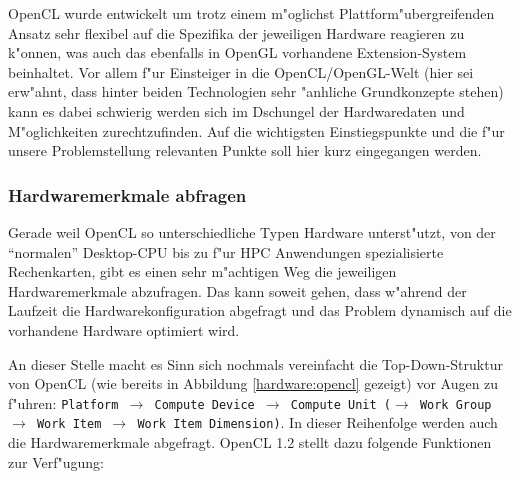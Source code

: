 \begin{refsection}
OpenCL wurde entwickelt um trotz einem m"oglichst Plattform"ubergreifenden Ansatz 
sehr flexibel auf die Spezifika der jeweiligen Hardware reagieren zu k"onnen, was
auch das ebenfalls in OpenGL vorhandene Extension-System beinhaltet. Vor allem f"ur
Einsteiger in die OpenCL/OpenGL-Welt (hier sei erw"ahnt, dass hinter beiden 
Technologien sehr "anhliche Grundkonzepte stehen) kann es dabei schwierig werden
sich im Dschungel der Hardwaredaten und M"oglichkeiten zurechtzufinden. Auf die 
wichtigsten Einstiegspunkte und die f"ur unsere Problemstellung relevanten Punkte
soll hier kurz eingegangen werden.


\subsubsection{Hardwaremerkmale abfragen}

Gerade weil OpenCL so unterschiedliche Typen Hardware unterst"utzt, von der ``normalen''
Desktop-CPU bis zu f"ur HPC Anwendungen spezialisierte Rechenkarten, gibt es einen
sehr m"achtigen Weg die jeweiligen Hardwaremerkmale abzufragen. Das kann soweit 
gehen, dass w"ahrend der Laufzeit die Hardwarekonfiguration abgefragt und das 
Problem dynamisch auf die vorhandene Hardware optimiert wird.

An dieser Stelle macht es Sinn sich nochmals vereinfacht die Top-Down-Struktur
von OpenCL (wie bereits in Abbildung \ref{hardware:opencl} gezeigt) vor Augen zu
f"uhren: \texttt{Platform $\rightarrow$ Compute Device $\rightarrow$ Compute
	Unit ($\rightarrow$ Work Group $\rightarrow$ Work Item $\rightarrow$ Work Item
Dimension)}. In dieser Reihenfolge werden auch die Hardwaremerkmale abgefragt.
OpenCL 1.2 stellt dazu folgende Funktionen zur Verf"ugung:


\end{refsection}
